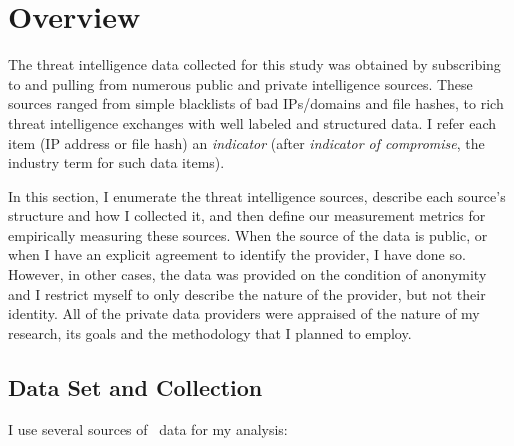\section{Overview}
\label{sec:overview}

The threat intelligence data collected for this study was obtained by
subscribing to and pulling from numerous public and private 
intelligence sources. These sources ranged from simple blacklists of 
bad IPs/domains and file hashes, to rich threat intelligence exchanges 
with well labeled and structured data.
I refer each item (\eg IP address or file hash) an \emph{indicator}
(after \emph{indicator of compromise}, the industry term for such data items).

In this section, I enumerate the threat intelligence sources, describe
each source's structure and how I collected it, and then define our
measurement metrics for empirically measuring these sources.  When the
source of the data is public, or when I have an explicit agreement to
identify the provider, I have done so.  However, in other cases, the
data was provided on the condition of anonymity and I restrict
myself to only describe the nature of the provider, but not their
identity.  All of the private data providers were appraised of the
nature of my research, its goals and the methodology that I planned
to employ.



\subsection{Data Set and Collection}
I use several sources of \ti\ data for my analysis:

